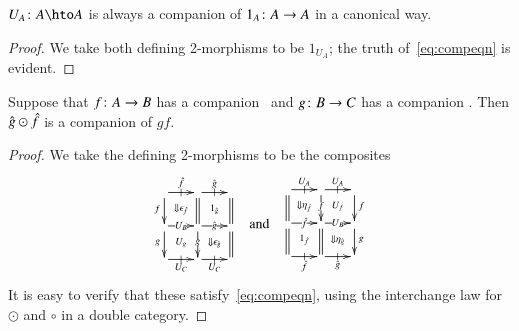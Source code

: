 \begin{lem}\label{thm:comp-unit}
  $U_A\maps A\hto A$ is always a companion of $1_A\colon A\to A$ in a
  canonical way.
\end{lem}
\begin{proof}
  We take both defining 2-morphisms to be
  $1_{U_A}$; the truth of~\eqref{eq:compeqn} is evident.
\end{proof}

\begin{lem}\label{thm:comp-compose}
  Suppose that $f\colon A\to B$ has a companion \fhat\ and $g\colon B\to
  C$ has a companion \ghat.  Then $\hat{g}\odot\hat{f}$ is a companion of
  $gf$.
\end{lem}
\begin{proof}
  We take the defining 2-morphisms to be the composites
  \[\vcenter{\xymatrix@-.5pc{
      \ar[r]|-@{|}^-{\fhat} \ar[d]_f \ar@{}[dr]|{\Downarrow \epsilon_{\hat{f}}}&
      \ar[r]|-@{|}^-{\ghat} \ar@{=}[d] \ar@{}[dr]|{1_{\ghat}} &
      \ar@{=}[d]\\
      \ar[r]|-{U_B} \ar[d]_g \ar@{}[dr]|{U_g} &
      \ar[r]|-{\ghat} \ar[d]|g \ar@{}[dr]|{\Downarrow \epsilon_{\hat{g}}}&
      \ar@{=}[d]\\
      \ar[r]|-@{|}_-{U_C} &
      \ar[r]|-@{|}_-{U_C} &
    }}\quad\text{and}\quad
  \vcenter{\xymatrix@-.5pc{
      \ar[r]|-@{|}^-{U_A} \ar@{=}[d] \ar@{}[dr]|{\Downarrow \eta_{\hat{f}}} &
      \ar[r]|-@{|}^-{U_A} \ar[d]|f \ar@{}[dr]|{U_f} &
      \ar[d]^f\\
      \ar[r]|-{\fhat} \ar@{=}[d] \ar@{}[dr]|{1_{\fhat}} &
      \ar[r]|-{U_B} \ar@{=}[d] \ar@{}[dr]|{\Downarrow \eta_{\hat{g}}}&
      \ar[d]^g\\
      \ar[r]|-@{|}_-{\fhat} &
      \ar[r]|-@{|}_-{\ghat} &
    }}
  \]
  It is easy to verify that these satisfy~\eqref{eq:compeqn}, using
  the interchange law for $\odot$ and $\circ$ in a double category.
\end{proof}

